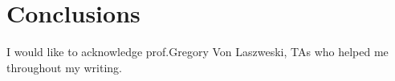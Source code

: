 \documentclass[sigconf]{acmart}
\begin{document}
\section{Conclusions}







\appendix



\begin{acks}

I would like to acknowledge prof.Gregory Von Laszweski, TAs who helped me throughout my writing.  
\end{acks}


 
\end{document}

